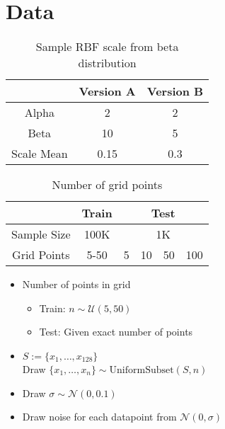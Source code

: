 \section{Data}
\label{exp:data}

\begin{table}[]
	\caption{Sample RBF scale from beta distribution}
	\begin{tabular}{c c c}
		\toprule
		& Version A & Version B\\
		\midrule
		Alpha & 2 & 2\\
		Beta & 10 & 5  \\\midrule
		Scale Mean & 0.15 & 0.3\\\bottomrule
	\end{tabular}
\end{table}
\begin{table}[]
	\caption{Number of grid points}
	\begin{tabular}{c c c c c c}
		\toprule
		& Train & \multicolumn{4}{c}{Test}\\
		\midrule
		Sample Size & 100K & \multicolumn{4}{c}{1K}\\
		Grid Points & 5-50 & 5 & 10 & 50 & 100  \\\bottomrule
	\end{tabular}
\end{table}

\begin{figure}
	\centering
	
\end{figure}

\begin{itemize}
	\item Number of points in grid
	\begin{itemize}
		\item Train: $n\sim \mathcal{U}(5,50)$
		\item Test: Given exact number of points
	\end{itemize}
	\item $S:=\{x_1, \ldots, x_{128}\}$\\ Draw $\{x_1, \ldots, x_n\} \sim \text{UniformSubset}(S, n)$
\end{itemize}

	\begin{itemize}
	\item Draw $\sigma \sim \mathcal{N}(0,0.1)$
	\item Draw noise for each datapoint from $\mathcal{N}(0,\sigma)$
\end{itemize}

